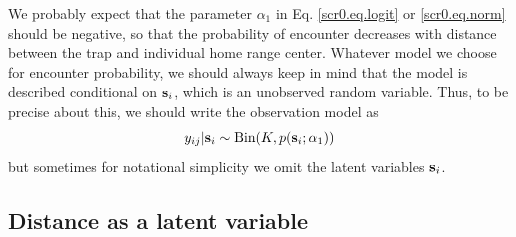 We probably expect that the parameter $\alpha_{1}$ in
Eq. \ref{scr0.eq.logit} or \ref{scr0.eq.norm} should be negative, so
that the probability of encounter decreases with distance between the
trap and individual home range center.  
Whatever model we choose for encounter probability, we should always keep
in mind that the model is described conditional on ${\bf s}_{i}$,
which is an unobserved random variable.  Thus, to be precise about
this, we should write the observation model as
\[
y_{ij}|{\bf s}_{i} \sim \mbox{Bin}(K, p({\bf s}_{i};\alpha_{1}))
\]
but sometimes for notational simplicity we omit the latent variables
${\bf s}_{i}$.

\subsection{Distance as a latent variable}

